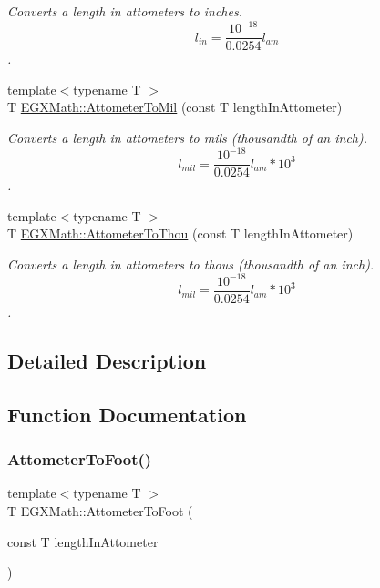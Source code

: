 \begin{DoxyCompactItemize}
\begin{DoxyCompactList}\small\item\em Converts a length in attometers to inches. \[ l_{in}= \frac{10^{-18}}{0.0254} l_{am} \]. \end{DoxyCompactList}\item 
{\footnotesize template$<$typename T $>$ }\\T \mbox{\hyperlink{group___e_g_x_math-_conversions-_length_conversions-_s_i-_attometer-_imperial_ga1ad78989a93e5316f787a6412e2c8e3a}{E\+G\+X\+Math\+::\+Attometer\+To\+Mil}} (const T length\+In\+Attometer)
\begin{DoxyCompactList}\small\item\em Converts a length in attometers to mils (thousandth of an inch). \[ l_{mil}= \frac{10^{-18}}{0.0254} l_{am} * 10^{3} \]. \end{DoxyCompactList}\item 
{\footnotesize template$<$typename T $>$ }\\T \mbox{\hyperlink{group___e_g_x_math-_conversions-_length_conversions-_s_i-_attometer-_imperial_gac9c9742b80b24da4e531fbcdc39976bb}{E\+G\+X\+Math\+::\+Attometer\+To\+Thou}} (const T length\+In\+Attometer)
\begin{DoxyCompactList}\small\item\em Converts a length in attometers to thous (thousandth of an inch). \[ l_{mil}= \frac{10^{-18}}{0.0254} l_{am} * 10^{3} \]. \end{DoxyCompactList}\end{DoxyCompactItemize}


\subsection{Detailed Description}


\subsection{Function Documentation}
\mbox{\label{group___e_g_x_math-_conversions-_length_conversions-_s_i-_attometer-_imperial_gaa4c9d59d58ec5811452592887a0261d9}} 
\subsubsection{\texorpdfstring{Attometer\+To\+Foot()}{AttometerToFoot()}}
{\footnotesize\ttfamily template$<$typename T $>$ \\
T E\+G\+X\+Math\+::\+Attometer\+To\+Foot (\begin{DoxyParamCaption}\item[{const T}]{length\+In\+Attometer }\end{DoxyParamCaption})}



